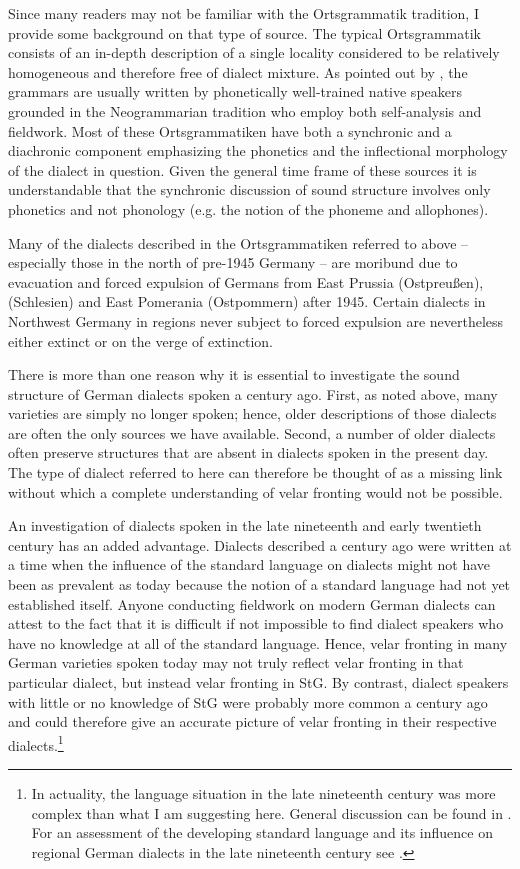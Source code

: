 Since many readers may not be familiar with the Ortsgrammatik tradition, I provide some background on that type of source. The typical Ortsgrammatik consists of an in-depth description of a single locality considered to be relatively homogeneous and therefore free of dialect mixture. As pointed out by \citet[80]{Murray2010}, the grammars are usually written by phonetically well-trained native speakers grounded in the Neogrammarian tradition who employ both self-analysis and fieldwork. Most of these Ortsgrammatiken have both a synchronic and a diachronic component emphasizing the phonetics and the inflectional morphology of the dialect in question. Given the general time frame of these sources it is understandable that the synchronic discussion of sound structure involves only phonetics and not phonology (e.g. the notion of the phoneme and allophones). 

Many of the dialects described in the Ortsgrammatiken referred to above -- especially those in the north of pre-1945 Germany -- are moribund due to evacuation and forced expulsion of Germans from East Prussia (Ostpreußen),  (Schlesien) and East Pomerania (Ostpommern) after 1945. Certain dialects in Northwest Germany in regions never subject to forced expulsion are nevertheless either extinct or on the verge of extinction.\largerpage

There is more than one reason why it is essential to investigate the sound structure of German dialects spoken a century ago. First, as noted above, many varieties are simply no longer spoken; hence, older descriptions of those dialects are often the only sources we have available. Second, a number of older dialects often preserve structures that are absent in dialects spoken in the present day. The type of dialect referred to here can therefore be thought of as a missing link without which a complete understanding of velar fronting would not be possible.

An investigation of dialects spoken in the late nineteenth and early twentieth century has an added advantage. Dialects described a century ago were written at a time when the influence of the standard language on dialects might not have been as prevalent as today because the notion of a standard language had not yet established itself. Anyone conducting fieldwork on modern German dialects can attest to the fact that it is difficult if not impossible to find dialect speakers who have no knowledge at all of the standard language. Hence, velar fronting in many German varieties spoken today may not truly reflect velar fronting in that particular dialect, but instead velar fronting in StG. By contrast, dialect speakers with little or no knowledge of StG were probably more common a century ago and could therefore give an accurate picture of velar fronting in their respective dialects.\footnote{In actuality, the language situation in the late nineteenth century was more complex than what I am suggesting here. General discussion can be found in \citet[343ff.]{Wells1985}. For an assessment of the developing standard language and its influence on regional German dialects in the late nineteenth century see \citet{Ganswindt2017}.}

